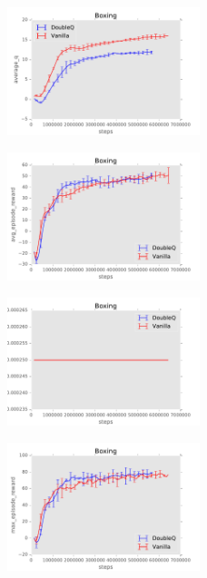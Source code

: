 \documentclass{sig-alternate}
\begin{document}
\begin{figure}[h!]
    \centering
    \includegraphics[width=0.5\textwidth]{../results/Boxing/Comparisons/DoubleQ/DoubleQ-baseline-average_q.pdf}
\end{figure}

\begin{figure}[h!]
    \centering
    \includegraphics[width=0.5\textwidth]{../results/Boxing/Comparisons/DoubleQ/DoubleQ-baseline-avg_episode_reward.pdf}
\end{figure}

\begin{figure}[h!]
    \centering
    \includegraphics[width=0.5\textwidth]{../results/Boxing/Comparisons/DoubleQ/DoubleQ-baseline-learning_rate.pdf}
\end{figure}


\begin{figure}[h!]
    \centering
    \includegraphics[width=0.5\textwidth]{../results/Boxing/Comparisons/DoubleQ/DoubleQ-baseline-max_episode_reward.pdf}
\end{figure}
\end{document}
